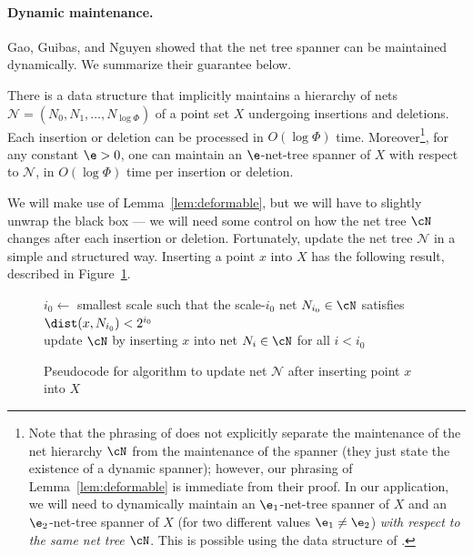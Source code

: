 \paragraph{Dynamic maintenance.}
Gao, Guibas, and Nguyen \cite{gao2004deformable} showed that the net tree spanner can be maintained dynamically. We summarize their guarantee below.
\begin{lemma}
\label{lem:deformable}
    There is a data structure that implicitly maintains a hierarchy of nets $\mathcal{N}=(N_0, N_1, \ldots, N_{\log \Phi})$ of a point set $X$ undergoing insertions and deletions. Each insertion or deletion can be processed in $O(\log \Phi)$ time.
% 
    Moreover\footnote{Note that the phrasing of \cite[Theorem 4.2]{gao2004deformable} does not explicitly separate the maintenance of the net hierarchy $\cN$ from the maintenance of the spanner (they just state the existence of a dynamic spanner); however, our phrasing of Lemma~\ref{lem:deformable} is immediate from their proof. In our application, we will need to dynamically maintain an $\e_1$-net-tree spanner of $X$ and an $\e_2$-net-tree spanner of $X$ (for two different values $\e_1 \neq \e_2$) \emph{with respect to the same net tree $\cN$}. This is possible using the data structure of \cite{gao2004deformable}.}, for any constant $\e > 0$, one can maintain an $\e$-net-tree spanner of $X$ with respect to $\mathcal{N}$, in $O(\log \Phi)$ time per insertion or deletion.
\end{lemma}
We will make use of Lemma~\ref{lem:deformable}, but we will have to slightly unwrap the black box --- we will need some control on how the net tree $\cN$ changes after each insertion or deletion. Fortunately, \cite{gao2004deformable} update the net tree $\mathcal{N}$ in a simple and structured way. Inserting a point $x$ into $X$ has the following result, described in Figure~\ref{fig:sparse-insert}.
\begin{figure}[h!]
    \centering
    \begin{algorithm}
    $i_0 \gets$ smallest scale such that the scale-$i_0$ net $N_{i_0} \in \cN$ satisfies $\dist(x, N_{i_0}) < 2^{i_0}$
    \\ update $\cN$ by inserting $x$ into net $N_i \in \cN$ for all $i < i_0$
    \end{algorithm}
    \caption{Pseudocode for \cite{gao2004deformable} algorithm to update net $\mathcal{N}$ after inserting point $x$ into $X$}
    \label{fig:sparse-insert}
\end{figure}
